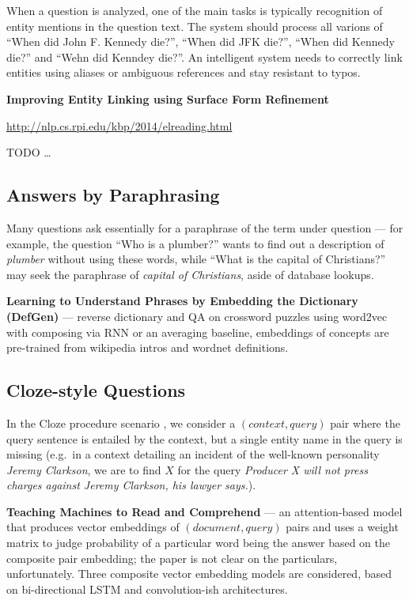 When a question is analyzed, one of the main tasks is typically recognition
of entity mentions in the question text.  The system should process all
varions of ``When did John F. Kennedy die?'', ``When did JFK die?'',
``When did Kennedy die?'' and ``Wehn did Kenndey die?''.  An intelligent
system needs to correctly link entities using aliases or ambiguous
references and stay resistant to typos.

\textbf{Improving Entity Linking using Surface Form Refinement}

\url{http://nlp.cs.rpi.edu/kbp/2014/elreading.html}

TODO \dots

\subsection{Answers by Paraphrasing}

Many questions ask essentially for a paraphrase of the term under
question --- for example, the question ``Who is a plumber?'' wants
to find out a description of \textit{plumber} without using these
words, while ``What is the capital of Christians?'' may seek the
paraphrase of \textit{capital of Christians}, aside of database lookups.

\textbf{Learning to Understand Phrases by Embedding the Dictionary (DefGen)} \citep{DefGen}
	--- reverse dictionary and QA on crossword puzzles using word2vec
	with composing via RNN or an averaging baseline, embeddings of
	concepts are pre-trained from wikipedia intros and wordnet definitions.

\subsection{Cloze-style Questions}

In the Cloze procedure scenario \citep{Cloze},
we consider a $(context, query)$ pair where the query
sentence is entailed by the context, but a single entity name in the query
is missing (e.g.\ in a context detailing an incident of the well-known personality
\textit{Jeremy Clarkson}, we are to find $X$ for the query
\textit{Producer X will not press charges against Jeremy Clarkson, his lawyer says.}).

\textbf{Teaching Machines to Read and Comprehend} \citep{ReadAndComprehend}
	--- an attention-based model that produces vector embeddings of $(document, query)$
	pairs and uses a weight matrix to judge probability of a particular
	word being the answer based on the composite pair embedding;
	the paper is not clear on the particulars, unfortunately.
	Three composite vector embedding models are considered,
	based on bi-directional LSTM and convolution-ish architectures.




